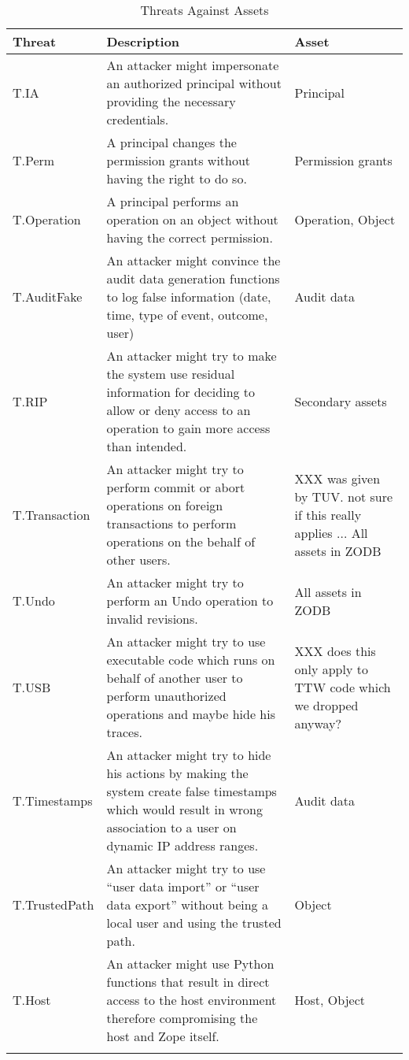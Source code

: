 \documentclass[12pt,english]{scrbook}
\begin{document}
\begin{longtable}[c]{lp{6cm}p{4cm}}
  \toprule
  Threat & Description & Asset\\
  \midrule\endhead

  T.IA
   & 
  An attacker might impersonate an authorized
  principal without providing the necessary
  credentials.
   & 
  Principal
   \\
  

  T.Perm
   & 
  A principal changes the permission grants
  without having the right to do so.
   & 
  Permission grants
   \\
  

  T.Operation
   & 
  A principal performs an operation on an object
  without having the correct permission.
   & 
  Operation, Object
   \\
  

  T.AuditFake
   & 
  An attacker might convince the audit data
  generation functions to log false information
  (date, time, type of event, outcome, user)
   & 
  Audit data
   \\
  

  T.RIP
   & 
  An attacker might try to make the system use
  residual information for deciding to allow
  or deny access to an operation to gain more
  access than intended.
   & 
  Secondary assets
   \\
  

  T.Transaction
   & 
  An attacker might try to perform commit or
  abort operations on foreign transactions to
  perform operations on the behalf of other
  users.
   & 
  XXX was given by TUV. not sure if this really applies ...
  All assets in ZODB
   \\
  

  T.Undo
   & 
  An attacker might try to perform an Undo
  operation to invalid revisions.
   & 
  All assets in ZODB
   \\
  

  T.USB
   & 
  An attacker might try to use executable code
  which runs on behalf of another user to perform
  unauthorized operations and maybe hide his
  traces.
   & 
  XXX does this only apply to TTW code which we dropped anyway?
   \\
  

  T.Timestamps
   & 
  An attacker might try to hide his actions
  by making the system create false timestamps
  which would result in wrong association to a
  user on dynamic IP address ranges.
   & 
  Audit data
   \\
  

  T.TrustedPath
   & 
  An attacker might try to use ``user data import''
  or ``user data export'' without being a local
  user and using the trusted path.
   & 
  Object
   \\
  

  T.Host
   & 
  An attacker might use Python functions that
  result in direct access to the host environment
  therefore compromising the host and Zope itself.
   & 
  Host, Object
  \\
  \bottomrule
\caption{Threats Against Assets}
\label{tab-threats}
\end{longtable}
  
\end{document}
